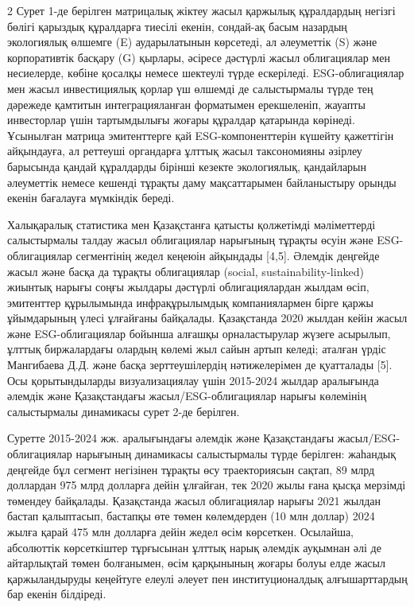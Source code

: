 \begin{multicols}{2}
Сурет 1-де берілген матрицалық жіктеу жасыл қаржылық құралдардың негізгі
бөлігі қарыздық құралдарға тиесілі екенін, сондай-ақ басым назардың
экологиялық өлшемге (E) аударылатынын көрсетеді, ал әлеуметтік (S) және
корпоративтік басқару (G) қырлары, әсіресе дәстүрлі жасыл облигациялар
мен несиелерде, көбіне қосалқы немесе шектеулі түрде ескеріледі.
ESG-облигациялар мен жасыл инвестициялық қорлар үш өлшемді де
салыстырмалы түрде тең дәрежеде қамтитын интеграцияланған форматымен
ерекшеленіп, жауапты инвесторлар үшін тартымдылығы жоғары құралдар
қатарында көрінеді. Ұсынылған матрица эмитенттерге қай
ESG-компоненттерін күшейту қажеттігін айқындауға, ал реттеуші органдарға
ұлттық жасыл таксономияны әзірлеу барысында қандай құралдарды бірінші
кезекте экологиялық, қандайларын әлеуметтік немесе кешенді тұрақты даму
мақсаттарымен байланыстыру орынды екенін бағалауға мүмкіндік береді.

Халықаралық статистика мен Қазақстанға қатысты қолжетімді мәліметтерді
салыстырмалы талдау жасыл облигациялар нарығының тұрақты өсуін және
ESG-облигациялар сегментінің жедел кеңеюін айқындады {[}4,5{]}. Әлемдік
деңгейде жасыл және басқа да тұрақты облигациялар (social,
sustainability-linked) жиынтық нарығы соңғы жылдары дәстүрлі
облигациялардан жылдам өсіп, эмитенттер құрылымында инфрақұрылымдық
компаниялармен бірге қаржы ұйымдарының үлесі ұлғайғаны байқалады.
Қазақстанда 2020 жылдан кейін жасыл және ESG-облигациялар бойынша
алғашқы орналастырулар жүзеге асырылып, ұлттық биржалардағы олардың
көлемі жыл сайын артып келеді; аталған үрдіс Мангибаева Д.Д. және басқа
зерттеушілердің нәтижелерімен де қуатталады {[}5{]}. Осы қорытындыларды
визуализациялау үшін 2015-2024 жылдар аралығында әлемдік және
Қазақстандағы жасыл/ESG-облигациялар нарығы көлемінің салыстырмалы
динамикасы сурет 2-де берілген.

Суретте 2015-2024 жж. аралығындағы әлемдік және Қазақстандағы
жасыл/ESG-облигациялар нарығының динамикасы салыстырмалы түрде берілген:
жаһандық деңгейде бұл сегмент негізінен тұрақты өсу траекториясын
сақтап, 89 млрд доллардан 975 млрд долларға дейін ұлғайған, тек 2020
жылы ғана қысқа мерзімді төмендеу байқалады. Қазақстанда жасыл
облигациялар нарығы 2021 жылдан бастап қалыптасып, бастапқы өте төмен
көлемдерден (10 млн доллар) 2024 жылға қарай 475 млн долларға дейін
жедел өсім көрсеткен. Осылайша, абсолюттік көрсеткіштер тұрғысынан
ұлттық нарық әлемдік ауқымнан әлі де айтарлықтай төмен болғанымен, өсім
қарқынының жоғары болуы елде жасыл қаржыландыруды кеңейтуге елеулі
әлеует пен институционалдық алғышарттардың бар екенін білдіреді.
\end{multicols}

